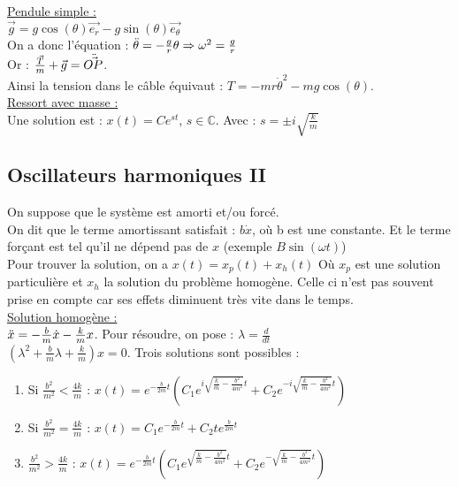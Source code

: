 \documentclass[../main.tex]{subfiles}
\begin{document}
\quad \underline{Pendule simple :}\\
$\vec{g} = g\cos(\theta) \vec{e_r} - g\sin(\theta) \vec{e_{\theta}}$\\
On a donc l'équation : $\Ddot{\theta} = -\frac{g}{r} \theta \Rightarrow \omega^2 = \frac{g}{r}$\\
Or : $\frac{\vec{T}}{m} + \vec{g} = \Ddot{\vec{OP}}$.\\
Ainsi la tension dans le câble équivaut : $T = -mr\Dot{\theta}^2 - mg\cos(\theta)$.\\

\quad \underline{Ressort avec masse :}\\
Une solution est : $x(t) = C e^{st}$, $s\in \mathbb{C}$. Avec : $s = \pm i\sqrt{\frac{k}{m}}$\\

\subsection{Oscillateurs harmoniques II}
On suppose que le système est amorti et/ou forcé. \\
On dit que le terme amortissant satisfait : $b \dot{x}$, où b est une constante. Et le terme forçant est tel qu'il ne dépend pas de $x$ (exemple $B \sin(\omega t)$)\\
Pour trouver la solution, on a $x(t) = x_p(t) + x_h(t)$ Où $x_p$ est une solution particulière et $x_h$ la solution du problème homogène. Celle ci n'est pas souvent prise en compte car ses effets diminuent très vite dans le temps.\\

\quad \underline{Solution homogène :}\\
$\Ddot{x} = -\frac{b}{m}\dot{x} - \frac{k}{m}x$. Pour résoudre, on pose : $\lambda = \frac{d}{dt}$\\
$(\lambda^2 + \frac{b}{m}\lambda + \frac{k}{m})x = 0$. Trois solutions sont possibles :\\
\begin{enumerate}
    \item Si $\frac{b^2}{m^2} < \frac{4k}{m}$ : $x(t) = e^{-\frac{b}{2m}t} (C_1 e^{i\sqrt{\frac{k}{m} - \frac{b^2}{4m^2}}t} + C_2 e^{-i\sqrt{\frac{k}{m} - \frac{b^2}{4m^2}}t}) $\\
    \item Si $\frac{b^2}{m^2} = \frac{4k}{m}$ : $x(t) = C_1 e^{-\frac{b}{2m} t} + C_2 t e^{\frac{b}{2m}t}$\\
    \item $\frac{b^2}{m^2} > \frac{4k}{m}$ : $x(t) = e^{-\frac{b}{2m}t} (C_1 e^{\sqrt{\frac{k}{m} - \frac{b^2}{4m^2}}t} + C_2 e^{-\sqrt{\frac{k}{m} - \frac{b^2}{4m^2}}t}) $\\
\end{enumerate}
\end{document}
